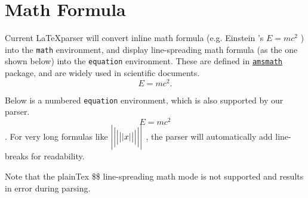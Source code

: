 \documentclass{article}
\newcommand{\pkg}[1]{\href{https://ctan.org/pkg/#1}{\texttt{#1}}}
\begin{document}
\section{Math Formula}
 \label{sec:math} \par Current \LaTeX parser will convert inline math formula
(e.g. Einstein 's
\begin{math}
  E=mc^2
\end{math}
 ) into the \texttt{math} environment, and display line-spreading math formula
(as the one shown below) into the \texttt{equation} environment. These are
defined in \pkg{amsmath} package, and are widely used in scientific documents.
\begin{displaymath}
  E=mc^2.
\end{displaymath}
 \par Below is a numbered \texttt{equation} environment, which is also
supported by our parser.
\begin{equation}
  E=mc^2
\end{equation}
 . For very long formulas like
\begin{math}
  \Biggl\lvert\biggl\lvert\Bigl\lvert\bigl\lvert\lvert x \rvert\bigr\rvert\Bigr
  \rvert\biggr\rvert\Biggr\rvert
\end{math}
 , the parser will automatically add line-breaks for readability. \par Note
that the plainTex \$\$ line-spreading math mode is not supported and results in
error during parsing.
\end{document}
